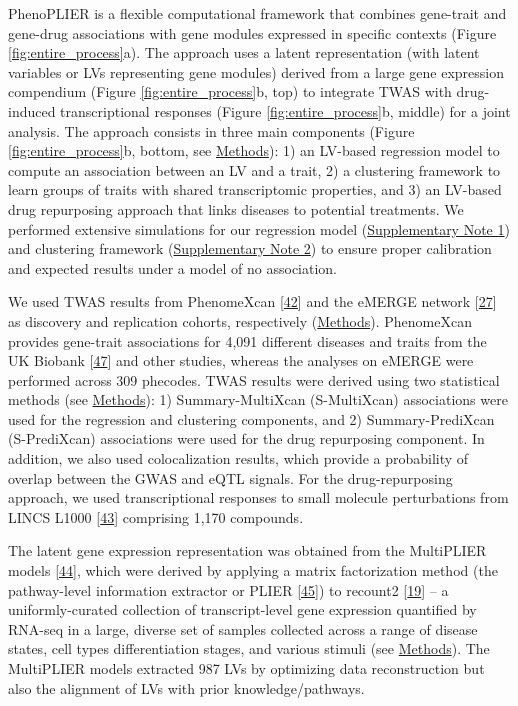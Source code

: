 \documentclass[
]{article}
\begin{document}
PhenoPLIER is a flexible computational framework that combines gene-trait and gene-drug associations with gene modules expressed in specific contexts (Figure \ref{fig:entire_process}a).
The approach uses a latent representation (with latent variables or LVs representing gene modules) derived from a large gene expression compendium (Figure \ref{fig:entire_process}b, top) to integrate TWAS with drug-induced transcriptional responses (Figure \ref{fig:entire_process}b, middle) for a joint analysis.
The approach consists in three main components (Figure \ref{fig:entire_process}b, bottom, see \protect\hyperlink{sec:methods}{Methods}):
1) an LV-based regression model to compute an association between an LV and a trait,
2) a clustering framework to learn groups of traits with shared transcriptomic properties,
and 3) an LV-based drug repurposing approach that links diseases to potential treatments.
We performed extensive simulations for our regression model (\protect\hyperlink{sm:reg:null_sim}{Supplementary Note 1}) and clustering framework (\protect\hyperlink{sm:clustering:null_sim}{Supplementary Note 2}) to ensure proper calibration and expected results under a model of no association.

We used TWAS results from PhenomeXcan {[}\protect\hyperlink{ref-lY5ln3dB}{42}{]} and the eMERGE network {[}\protect\hyperlink{ref-gZAOkumx}{27}{]} as discovery and replication cohorts, respectively (\protect\hyperlink{sec:methods:twas}{Methods}).
PhenomeXcan provides gene-trait associations for 4,091 different diseases and traits from the UK Biobank {[}\protect\hyperlink{ref-nmJxPpE5}{47}{]} and other studies, whereas the analyses on eMERGE were performed across 309 phecodes.
TWAS results were derived using two statistical methods (see \protect\hyperlink{sec:methods:predixcan}{Methods}):
1) Summary-MultiXcan (S-MultiXcan) associations were used for the regression and clustering components,
and 2) Summary-PrediXcan (S-PrediXcan) associations were used for the drug repurposing component.
In addition, we also used colocalization results, which provide a probability of overlap between the GWAS and eQTL signals.
For the drug-repurposing approach, we used transcriptional responses to small molecule perturbations from LINCS L1000 {[}\protect\hyperlink{ref-F7lIlh2N}{43}{]} comprising 1,170 compounds.

The latent gene expression representation was obtained from the MultiPLIER models {[}\protect\hyperlink{ref-14rnBunuZ}{44}{]}, which were derived by applying a matrix factorization method (the pathway-level information extractor or PLIER {[}\protect\hyperlink{ref-Ki2ij7zE}{45}{]}) to recount2 {[}\protect\hyperlink{ref-6SPTvFXq}{19}{]} -- a uniformly-curated collection of transcript-level gene expression quantified by RNA-seq in a large, diverse set of samples collected across a range of disease states, cell types differentiation stages, and various stimuli (see \protect\hyperlink{sec:methods:multiplier}{Methods}).
The MultiPLIER models extracted 987 LVs by optimizing data reconstruction but also the alignment of LVs with prior knowledge/pathways.
\end{document}
